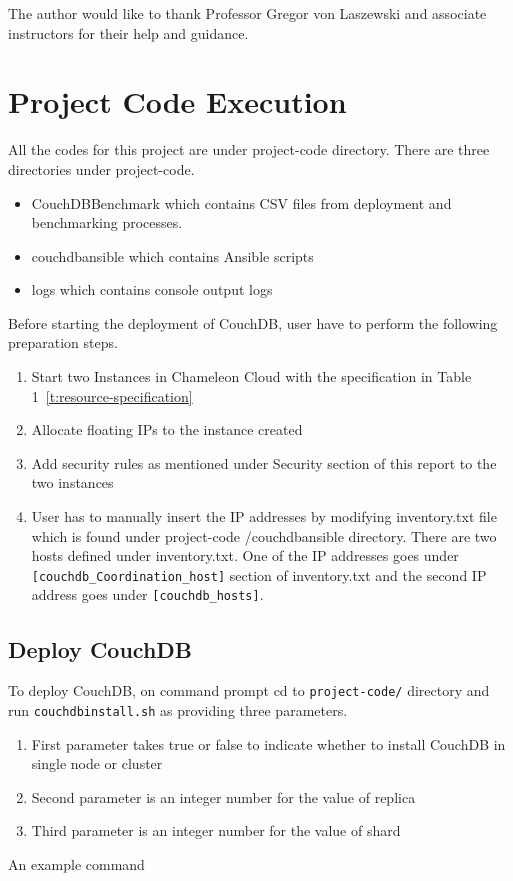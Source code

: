 The author would like to thank Professor Gregor von Laszewski and
associate instructors for their help and guidance.



 
\appendix
\section{Project Code Execution}

All the codes for this project are under project-code
directory. There are three directories under project-code.
\begin{itemize}
  \item CouchDBBenchmark which contains CSV files from deployment and
    benchmarking processes.  
  \item couchdbansible which contains Ansible scripts
  \item logs which contains console output logs
\end{itemize}

 Before starting the deployment of CouchDB, user have to
perform the following preparation steps.
\begin{enumerate}
  \item Start two Instances in Chameleon Cloud with the specification
    in Table 1~\ref{t:resource-specification}
   \item  Allocate floating IPs to the instance created
    \item Add  security rules as mentioned under Security section
      of this report to the two instances 
    \item  User has to manually insert the IP addresses by modifying
      inventory.txt file which is found under project-code
      /couchdbansible directory. There are two hosts 
      defined under inventory.txt. One of the IP addresses
      goes under \verb|[couchdb_Coordination_host]| section of inventory.txt
      and the second IP address goes under \verb|[couchdb_hosts]|.
\end{enumerate}

\subsection{Deploy CouchDB}
To deploy CouchDB, on command prompt cd to \verb|project-code/| directory and run
\verb|couchdbinstall.sh| as providing three parameters. 
\begin{enumerate}
  \item First parameter takes true or false to indicate whether to
    install CouchDB in single node or cluster
    \item Second parameter is an integer number for the value of
      replica
      \item Third parameter is an integer number for the value of
      shard
\end{enumerate}
An example command


